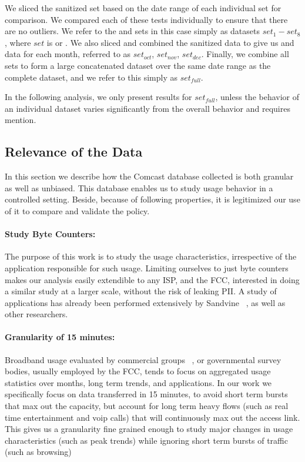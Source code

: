 We sliced the sanitized \test set based on the date range of each 
individual \control set for comparison. We compared each of these tests 
individually to ensure that there are no outliers. We refer to the \test and 
\control sets in this case simply as datasets $set_1 - set_8$, where $set$ is 
\test or \control. We also sliced and combined the sanitized data to give us 
\control and \test data for each month, referred to as $set_{oct}$, $set_{nov}$, 
$set_{dec}$. Finally, we combine all \control sets to form a large concatenated 
dataset over the same date range as the complete \test dataset, and we refer to 
this simply as $set_{full}$. 

In the following analysis, we only present results for $set_{full}$, unless the 
behavior of an individual dataset varies significantly from the overall behavior 
and requires mention.

\subsection{Relevance of the Data}

In this section we describe how the Comcast database collected is both granular 
as well as unbiased. This database enables us to study usage behavior in a 
controlled setting. Beside, because of following properties, it is legitimized 
our use of it to compare and validate the \FCC policy.

\paragraph{Study Byte Counters:} The purpose of this work is to study the usage 
characteristics, irrespective of the application responsible for such usage. 
Limiting ourselves to just byte counters makes our analysis easily extendible 
to any ISP, and the FCC, interested in doing a similar study at a larger 
scale, without the risk of leaking PII. A study of applications has already 
been performed extensively by Sandvine ~\cite{}, as well as other researchers.


\paragraph{Granularity of 15 minutes:} Broadband usage evaluated by commercial 
groups ~\cite{}, or governmental survey bodies, usually employed by the FCC, 
tends to focus on aggregated usage statistics over months, long term trends, and 
applications. In our work we specifically focus on data transferred in 15 
minutes, to avoid short term bursts that max out the capacity, but account for 
long term heavy flows (such as real time entertainment and voip calls) that will 
continuously max out the access link. This gives us a granularity fine grained 
enough to study major changes in usage characteristics (such as peak trends) 
while ignoring short term bursts of traffic (such as browsing)

